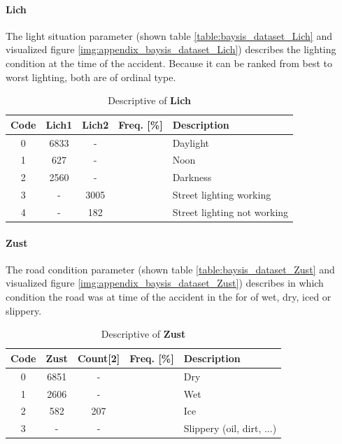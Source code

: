 \paragraph{Lich}
The light situation parameter (shown table \autoref{table:baysis_dataset_Lich} and visualized figure \autoref{img:appendix_baysis_dataset_Lich}) describes the lighting condition at the time of the accident. Because it can be ranked from best to worst lighting, both are of ordinal type.
\begin{table}[ht]
	\centering
	\small
	\begin{tabular}{c|c|c|c|l}
		\toprule
		Code & \textbf{Lich1} & \textbf{Lich2} & Freq. [\%] & Description \\ 
		\midrule 
		0 & 6833 	& - 	& & Daylight \\
		1 & 627 	& -		& & Noon \\
		2 & 2560	& - 	& & Darkness \\
		3 & - 		& 3005	& & Street lighting working \\
		4 & - 		& 182	& & Street lighting not working \\
		\bottomrule
	\end{tabular}
	\caption{Descriptive of \textbf{Lich}}
	\label{table:baysis_dataset_Lich}
	\vspace{-8mm}
\end{table} 

\paragraph{Zust}
The road condition parameter (shown table \autoref{table:baysis_dataset_Zust} and visualized figure \autoref{img:appendix_baysis_dataset_Zust}) describes in which condition the road was at time of the accident in the for of wet, dry, iced or slippery.
\begin{table}[ht]
	\centering
	\small
	\begin{tabular}{c|c|c|c|l}
		\toprule
		Code & \textbf{Zust} & Count[2] & Freq. [\%] & Description \\ 
		\midrule 
		0 & 6851 	& -		& & Dry \\ 
 		1 & 2606	& -		& & Wet \\ 
 		2 & 582		& 207	& & Ice \\
 		3 & - 		& -		& & Slippery (oil, dirt, ...)  \\
	\end{tabular}
	\caption{Descriptive of \textbf{Zust}}
	\label{table:baysis_dataset_Zust}
	\vspace{-8mm}
\end{table}

